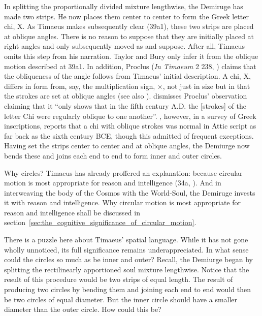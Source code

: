 In splitting the proportionally divided mixture lengthwise, the Demiruge has made two strips. He now places them center to center to form the Greek letter chi, {\sbl Χ}. As Timaeus makes subsequently clear (39a1), these two strips are placed at oblique angles. There is no reason to suppose that they are initially placed at right angles and only subsequently moved as \citet[147]{Taylor:1928qb} and \citet[36 n1]{Bury:1929jb} suppose. After all, Timaeus omits this step from his narration. Taylor and Bury only infer it from the oblique motion described at 39a1. In addition, Proclus (\emph{In Timaeum} 2 238, \citealt{Diehl:1903re}) claims that the obliqueness of the angle follows from Timaeus' initial description. A chi, {\sbl Χ}, differs in form from, say, the multiplication sign, ×, not just in size but in that the strokes are set at oblique angles (see also \citealt[111 n7]{Archer-Hind:1888qd}). \citet[147 n1]{Taylor:1928qb} dismisses Proclus' observation claiming that it ``only shows that in the fifth century \textsc{A}.\textsc{D}. the [strokes] of the letter Chi were regularly oblique to one another''. \citet[67]{Jeffrey:1961aa}, however, in a survey of Greek inscriptions, reports that a chi with oblique strokes was normal in Attic script as far back as the sixth century \textsc{BCE}, though this admitted of frequent exceptions. Having set the strips center to center and at oblique angles, the Demiurge now bends these and joins each end to end to form inner and outer circles. 

Why circles? Timaeus has already proffered an explanation: because circular motion is most appropriate for reason and intelligence (34a, \citealt[31]{Vlastos:1975aa}). And in interweaving the body of the Cosmos with the World-Soul, the Demiruge invests it with reason and intelligence. Why circular motion is most appropriate for reason and intelligence shall be discussed in section~\ref{sec:the_cognitive_significance_of_circular_motion}.

There is a puzzle here about Timaeus' spatial language. While it has not gone wholly unnoticed, its full significance remains underappreciated. In what sense could the circles so much as be inner and outer? Recall, the Demiurge began by splitting the rectilinearly apportioned soul mixture lengthwise. Notice that the result of this procedure would be two strips of equal length. The result of producing two circles by bending them and joining each end to end would then be two circles of equal diameter. But the inner circle should have a smaller diameter than the outer circle. How could this be?

